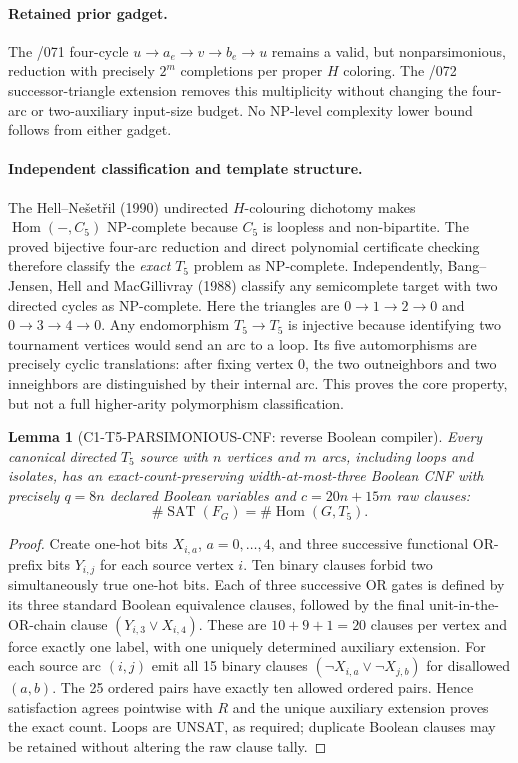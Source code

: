 \documentclass[11pt]{article}
\newtheorem{lemma}{Lemma}
\begin{document}
\paragraph{Retained prior gadget.}
The /071 four-cycle $u\to a_e\to v\to b_e\to u$ remains a valid,
but nonparsimonious, reduction with precisely $2^m$ completions
per proper $H$ coloring. The /072 successor-triangle extension
removes this multiplicity without changing the four-arc or
two-auxiliary input-size budget. No NP-level complexity lower
bound follows from either gadget.


\paragraph{Independent classification and template structure.}
The Hell--Ne\v{s}et\v{r}il (1990) undirected $H$-colouring
dichotomy makes $\operatorname{Hom}(-,C_5)$ NP-complete
because $C_5$ is loopless and non-bipartite.
The proved bijective four-arc reduction and direct polynomial
certificate checking therefore classify the \emph{exact}
$T_5$ problem as NP-complete.
Independently, Bang--Jensen, Hell and MacGillivray (1988)
classify any semicomplete target with two directed cycles
as NP-complete. Here the triangles are
$0\to1\to2\to0$ and $0\to3\to4\to0$.
Any endomorphism $T_5\to T_5$ is injective because
identifying two tournament vertices would send an arc to a loop.
Its five automorphisms are precisely cyclic translations:
after fixing vertex $0$, the two outneighbors and two
inneighbors are distinguished by their internal arc.
This proves the core property, but not a full
higher-arity polymorphism classification.

\begin{lemma}[C1-T5-PARSIMONIOUS-CNF: reverse Boolean compiler]
Every canonical directed $T_5$ source with $n$ vertices and $m$
arcs, including loops and isolates, has an exact-count-preserving
width-at-most-three Boolean CNF with precisely
$q=8n$ declared Boolean variables and
$c=20n+15m$ raw clauses:
\[
 \boxed{\#\operatorname{SAT}(F_G)
        =\#\operatorname{Hom}(G,T_5).}
\]
\end{lemma}
\begin{proof}
Create one-hot bits $X_{i,a}$, $a=0,\ldots,4$,
and three successive functional OR-prefix bits $Y_{i,j}$
for each source vertex $i$.
Ten binary clauses forbid two simultaneously true one-hot bits.
Each of three successive OR gates is defined by its three
standard Boolean equivalence clauses, followed by the final
unit-in-the-OR-chain clause $(Y_{i,3}\lor X_{i,4})$.
These are $10+9+1=20$ clauses per vertex and force
exactly one label, with one uniquely determined auxiliary extension.
For each source arc $(i,j)$ emit all 15 binary clauses
$(\neg X_{i,a}\lor\neg X_{j,b})$ for disallowed $(a,b)$.
The 25 ordered pairs have exactly ten allowed ordered pairs.
Hence satisfaction agrees pointwise with $R$ and
the unique auxiliary extension proves the exact count.
Loops are UNSAT, as required; duplicate Boolean clauses
may be retained without altering the raw clause tally.
\end{proof}
\end{document}
